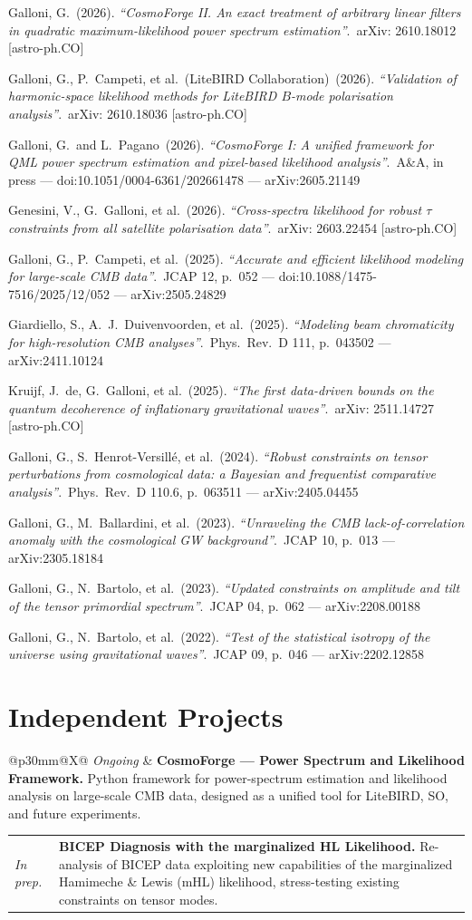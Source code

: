 \documentclass[10pt,a4paper]{article}
\makeatletter
\newcommand{\cvrow}[2]{%
  \noindent\begin{tabularx}{\linewidth}{@{}p{30mm}@{\hspace{4mm}}X@{}}
    {\itshape\small\textcolor{muted}{#1}} & #2 \\
  \end{tabularx}\par\vspace{0.3pt}
}
\newcommand{\pub}[4]{%
  \noindent #1\ (#2). \textit{``#3''}.\ {\small\textcolor{muted}{#4}}\par\vspace{0.8pt}
}
\makeatother
\begin{document}
\pub{Galloni, G.}{2026}{CosmoForge II. An exact treatment of arbitrary linear filters in quadratic maximum-likelihood power spectrum estimation}{arXiv: 2610.18012 [astro-ph.CO]}
\pub{Galloni, G., P.\ Campeti, et al.\ (LiteBIRD Collaboration)}{2026}{Validation of harmonic-space likelihood methods for LiteBIRD $B$-mode polarisation analysis}{arXiv: 2610.18036 [astro-ph.CO]}
\pub{Galloni, G.\ and L.\ Pagano}{2026}{CosmoForge I: A unified framework for QML power spectrum estimation and pixel-based likelihood analysis}{A\&A, in press --- doi:10.1051/0004-6361/202661478 --- arXiv:2605.21149}
\pub{Genesini, V., G.\ Galloni, et al.}{2026}{Cross-spectra likelihood for robust $\tau$ constraints from all satellite polarisation data}{arXiv: 2603.22454 [astro-ph.CO]}
\pub{Galloni, G., P.\ Campeti, et al.}{2025}{Accurate and efficient likelihood modeling for large-scale CMB data}{JCAP 12, p.\ 052 --- doi:10.1088/1475-7516/2025/12/052 --- arXiv:2505.24829}
\pub{Giardiello, S., A.\ J.\ Duivenvoorden, et al.}{2025}{Modeling beam chromaticity for high-resolution CMB analyses}{Phys.\ Rev.\ D 111, p.\ 043502 --- arXiv:2411.10124}
\pub{Kruijf, J.\ de, G.\ Galloni, et al.}{2025}{The first data-driven bounds on the quantum decoherence of inflationary gravitational waves}{arXiv: 2511.14727 [astro-ph.CO]}
\pub{Galloni, G., S.\ Henrot-Versillé, et al.}{2024}{Robust constraints on tensor perturbations from cosmological data: a Bayesian and frequentist comparative analysis}{Phys.\ Rev.\ D 110.6, p.\ 063511 --- arXiv:2405.04455}
\pub{Galloni, G., M.\ Ballardini, et al.}{2023}{Unraveling the CMB lack-of-correlation anomaly with the cosmological GW background}{JCAP 10, p.\ 013 --- arXiv:2305.18184}
\pub{Galloni, G., N.\ Bartolo, et al.}{2023}{Updated constraints on amplitude and tilt of the tensor primordial spectrum}{JCAP 04, p.\ 062 --- arXiv:2208.00188}
\pub{Galloni, G., N.\ Bartolo, et al.}{2022}{Test of the statistical isotropy of the universe using gravitational waves}{JCAP 09, p.\ 046 --- arXiv:2202.12858}

\section*{Independent Projects}
\cvrow{Ongoing}{\textbf{CosmoForge --- Power Spectrum and Likelihood Framework.} Python framework for power-spectrum estimation and likelihood analysis on large-scale CMB data, designed as a unified tool for LiteBIRD, SO, and future experiments.}
\cvrow{In prep.}{\textbf{BICEP Diagnosis with the marginalized HL Likelihood.} Re-analysis of BICEP data exploiting new capabilities of the marginalized Hamimeche \& Lewis (mHL) likelihood, stress-testing existing constraints on tensor modes.}
\end{document}
